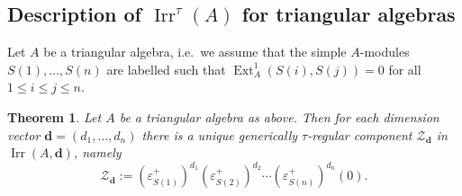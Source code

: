 \documentclass[12pt,reqno]{amsart}
\newtheorem{Thm}{Theorem}[section]
\theoremstyle{definition}
\newcommand{\bd}{\mathbf{d}}
\newcommand{\Ext}{\operatorname{Ext}}
\newcommand{\irr}{\operatorname{Irr}}
\newcommand{\calZ}{\mathcal{Z}}
\begin{document}

\subsection{Description of $\irr^\tau(A)$ for triangular algebras}
Let $A$ be a triangular algebra,
i.e.\ we assume that the simple
$A$-modules $S(1),\ldots,S(n)$ are labelled such that
$\Ext_A^1(S(i),S(j)) = 0$ for all $1 \le i \le j \le n$.


\begin{Thm}\label{thm:main3b}
Let $A$ be a triangular algebra as above.
Then for each dimension vector $\bd = (d_1,\ldots,d_n)$ there is a unique generically
$\tau$-regular
component $\calZ_\bd$ in $\irr(A,\bd)$, namely
$$
\calZ_\bd := (\varepsilon_{S(1)}^+)^{d_1} (\varepsilon_{S(2)}^+)^{d_2}  \cdots
 (\varepsilon_{S(n)}^+)^{d_n}(0).
$$
\end{Thm}
\end{document}
